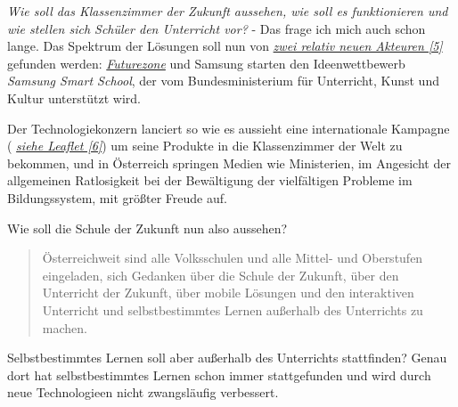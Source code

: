 \documentclass[10pt,a4paper,ngerman,twoside]{article} %
\begin{document}

\emph{Wie soll das Klassenzimmer der Zukunft aussehen, wie soll es funktionieren und wie stellen sich Schüler den Unterricht vor?} - Das frage ich mich auch schon lange. Das Spektrum der Lösungen soll nun von \href{http://futurezone.at/digitallife/14934-eboards-und-tablets-fuer-die-besten-ideen.php}{\textit{zwei relativ neuen Akteuren [5]}}  gefunden werden: \href{http://futurezone.at/}{\textit{Futurezone}} und Samsung starten den Ideenwettbewerb \emph{Samsung Smart School}, der vom Bundesministerium für Unterricht, Kunst und Kultur unterstützt wird.

Der Technologiekonzern lanciert so wie es aussieht eine internationale Kampagne ( \href{http://www.samsung.com/global/business/business-images/resource/RR-BC/2012/10/SamsungSmartSchoolLeaflet-0.pdf}{\textit{siehe Leaflet [6]}}) 
um seine Produkte in die Klassenzimmer der Welt zu bekommen, und in Österreich springen Medien wie Ministerien, im Angesicht der allgemeinen Ratlosigkeit bei der Bewältigung der vielfältigen Probleme im Bildungssystem, mit größter Freude auf.

Wie soll die Schule der Zukunft nun also aussehen?
\begin{quote}\glqq 
Österreichweit sind alle Volksschulen und alle Mittel- und Oberstufen eingeladen, sich Gedanken über die Schule der Zukunft, über den Unterricht der Zukunft, über mobile Lösungen und den interaktiven Unterricht und selbstbestimmtes Lernen außerhalb des Unterrichts zu machen.\grqq
\end{quote}

Selbstbestimmtes Lernen soll aber außerhalb des Unterrichts stattfinden? Genau dort hat selbstbestimmtes Lernen schon immer stattgefunden und wird durch neue Technologieen nicht zwangsläufig verbessert.
\end{document}
